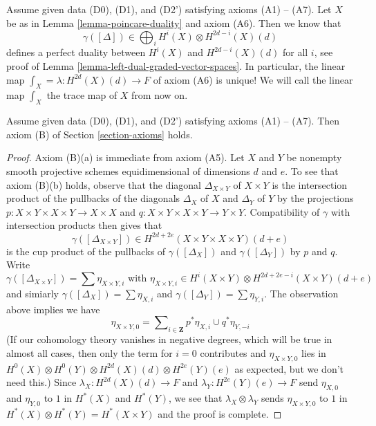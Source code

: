 \begin{remark}
\label{remark-trace}
Assume given data (D0), (D1), and (D2') satisfying axioms (A1) -- (A7).
Let $X$ be as in Lemma \ref{lemma-poincare-duality} and axiom (A6).
Then we know that
$$
\gamma([\Delta]) \in \bigoplus\nolimits_i H^i(X) \otimes H^{2d - i}(X)(d)
$$
defines a perfect duality between $H^i(X)$ and $H^{2d - i}(X)(d)$
for all $i$, see proof of Lemma \ref{lemma-left-dual-graded-vector-spaces}.
In particular, the linear map $\int_X = \lambda : H^{2d}(X)(d) \to F$ of
axiom (A6) is unique! We will call the linear map $\int_X$ the trace map
of $X$ from now on.
\end{remark}

\begin{lemma}
\label{lemma-trace-product}
Assume given data (D0), (D1), and (D2') satisfying axioms (A1) -- (A7).
Then axiom (B) of Section \ref{section-axioms} holds.
\end{lemma}

\begin{proof}
Axiom (B)(a) is immediate from axiom (A5).
Let $X$ and $Y$ be nonempty smooth projective schemes equidimensional
of dimensions $d$ and $e$. To see that axiom (B)(b)
holds, observe that the diagonal $\Delta_{X \times Y}$ of $X \times Y$
is the intersection product of the pullbacks of the diagonals
$\Delta_X$ of $X$ and $\Delta_Y$ of $Y$ by the projections
$p : X \times Y \times X \times Y \to X \times X$ and
$q : X \times Y \times X \times Y \to Y \times Y$.
Compatibility of $\gamma$ with intersection products then gives
that
$$
\gamma([\Delta_{X \times Y}]) \in
H^{2d + 2e}(X \times Y \times X \times Y)(d + e)
$$
is the cup product of the pullbacks of $\gamma([\Delta_X])$
and $\gamma([\Delta_Y])$ by $p$ and $q$. Write
$$
\gamma([\Delta_{X \times Y}]) = \sum \eta_{X \times Y, i}
\text{ with }
\eta_{X \times Y, i} \in
H^i(X \times Y) \otimes H^{2d + 2e - i}(X \times Y)(d + e)
$$
and simiarly $\gamma([\Delta_X]) = \sum \eta_{X, i}$ and
$\gamma([\Delta_Y]) = \sum \eta_{Y, i}$. The observation above
implies we have
$$
\eta_{X \times Y, 0} =
\sum\nolimits_{i \in \mathbf{Z}} p^*\eta_{X, i} \cup q^*\eta_{Y, -i}
$$
(If our cohomology theory vanishes in negative degrees, which will
be true in almost all cases, then only the term for $i = 0$ contributes
and $\eta_{X \times Y, 0}$ lies in
$H^0(X) \otimes H^0(Y) \otimes H^{2d}(X)(d) \otimes H^{2e}(Y)(e)$ as expected,
but we don't need this.) Since $\lambda_X : H^{2d}(X)(d) \to F$ and 
$\lambda_Y : H^{2e}(Y)(e) \to F$ send $\eta_{X, 0}$ and $\eta_{Y, 0}$
to $1$ in $H^*(X)$ and $H^*(Y)$, we see that $\lambda_X \otimes \lambda_Y$
sends $\eta_{X \times Y, 0}$ to $1$ in
$H^*(X) \otimes H^*(Y) = H^*(X \times Y)$ and the proof is complete.
\end{proof}

